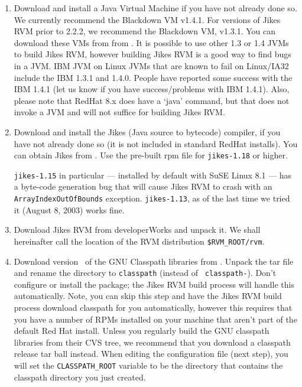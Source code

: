 \begin{enumerate}

\item Download and install a Java Virtual Machine if you have not
already done so.  We currently recommend the Blackdown VM v1.4.1. 
For versions of Jikes RVM prior to 2.2.2, we recommend
the Blackdown VM, v1.3.1.  You can download these VMs from 
from \xlink{{\tt \BlackdownURL}} {\BlackdownURL}. 
It is possible to use other 1.3 or 1.4 JVMs to build Jikes RVM,
however building Jikes RVM is a good way to find bugs in a JVM.
{\index IBM JVM on Linux}
JVMs that are known to fail on Linux/IA32 include the IBM 1.3.1 and
1.4.0.  People have reported some success with the IBM 1.4.1 (let us
know if you have success/problems with IBM 1.4.1). Also, please note
that RedHat 8.x does have a `java' command, but that does not invoke a
JVM and will not suffice for building Jikes RVM.

\item Download and install the Jikes (Java source to bytecode)
compiler, if you have not already 
done so (it is not included in standard RedHat installs).  You can
obtain Jikes from .
Use the pre-built rpm file for {\tt jikes-1.18} or higher.   

{\tt jikes-1.15} in
particular --- installed by default with SuSE Linux 8.1 --- has a
byte-code generation bug that will cause Jikes RVM to crash with an
{\tt ArrayIndexOutOfBounds} exception.  {\tt jikes-1.13}, as of the last
time we tried it (August 8, 2003) works fine.

\item Download Jikes RVM from developerWorks and unpack it.  We shall
hereinafter call the location of the RVM distribution {\tt \$RVM\_ROOT/rvm}.

\item Download version \classpathversion\ of the GNU Classpath
libraries from 
\xlink{{\tt \classpathftp}}{\classpathftp}. 
Unpack the tar file and rename the
directory to {\tt classpath} (instead of {\tt
classpath-\classpathversion}). Don't 
configure or install the package; the Jikes RVM build process will
handle this automatically.  Note, you can skip this step and have the
Jikes RVM build process download classpath for you automatically,
however this requires that you have a number of RPMs installed
on your machine that aren't part of the default Red Hat install.
Unless you regularly build the GNU classpath libraries from their CVS
tree, we recommend that you download a classpath release tar ball
instead. When editing the configuration file (next step), you will set
the {\tt CLASSPATH\_ROOT} variable to be the directory that contains the
classpath directory you just created.  


\end{enumerate}

